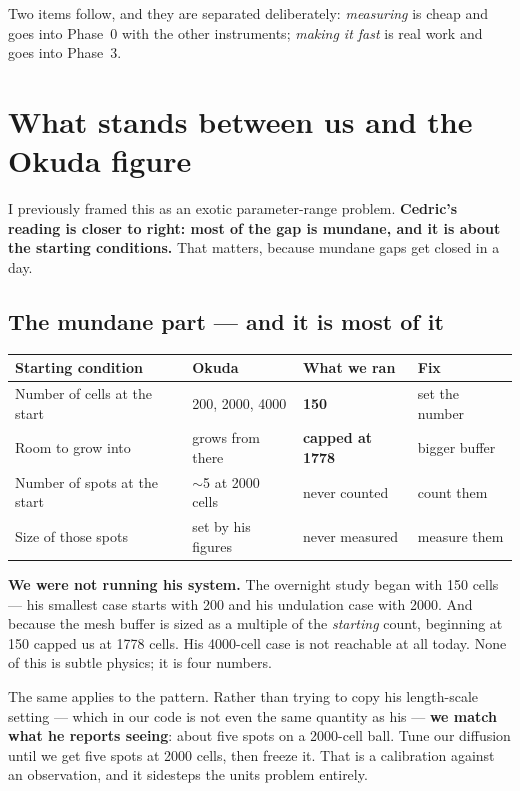 \documentclass[11pt,a4paper]{article}
\begin{document}
Two items follow, and they are separated deliberately: \emph{measuring} is cheap and goes into
Phase~0 with the other instruments; \emph{making it fast} is real work and goes into Phase~3.

\section{What stands between us and the Okuda figure}\label{sec:okuda}

I previously framed this as an exotic parameter-range problem. \textbf{Cedric's reading is closer
to right: most of the gap is mundane, and it is about the starting conditions.} That matters,
because mundane gaps get closed in a day.

\subsection{The mundane part --- and it is most of it}

\begin{center}\small
\begin{tabular}{@{}l l l l@{}}
\toprule
\textbf{Starting condition} & \textbf{Okuda} & \textbf{What we ran} & \textbf{Fix}\\
\midrule
Number of cells at the start & 200, 2000, 4000 & \textbf{150}          & set the number\\
Room to grow into            & grows from there & \textbf{capped at 1778} & bigger buffer\\
Number of spots at the start & $\sim$5 at 2000 cells & never counted   & count them\\
Size of those spots          & set by his figures & never measured     & measure them\\
\bottomrule
\end{tabular}
\end{center}

\textbf{We were not running his system.} The overnight study began with 150 cells --- his smallest
case starts with 200 and his undulation case with 2000. And because the mesh buffer is sized as a
multiple of the \emph{starting} count, beginning at 150 capped us at 1778 cells. His 4000-cell case
is not reachable at all today. None of this is subtle physics; it is four numbers.

The same applies to the pattern. Rather than trying to copy his length-scale setting --- which in
our code is not even the same quantity as his --- \textbf{we match what he reports seeing}: about
five spots on a 2000-cell ball. Tune our diffusion until we get five spots at 2000 cells, then
freeze it. That is a calibration against an observation, and it sidesteps the units problem
entirely.
\end{document}
